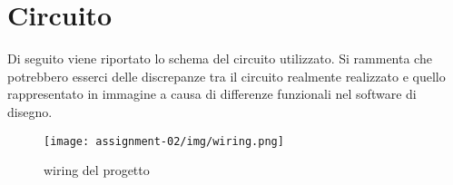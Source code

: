 \documentclass{report}
\begin{document}
\chapter{Circuito}
Di seguito viene riportato lo schema del circuito utilizzato. Si rammenta che potrebbero esserci delle discrepanze tra il circuito realmente realizzato e quello rappresentato in immagine a causa di differenze funzionali nel software di disegno.
\begin{figure}[H]
    \centering
    \texttt{[image: assignment-02/img/wiring.png]}
    \caption{wiring del progetto}
    \label{fig:wiring}
\end{figure}
\end{document}
